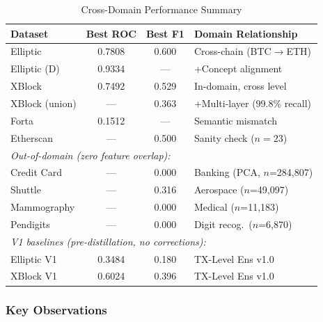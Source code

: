 \documentclass[journal]{IEEEtran}
\begin{document}
\begin{table}[!t]
\centering
\caption{Cross-Domain Performance Summary}
\label{tab:crossdomain}
\scriptsize
\begin{tabular}{lccl}
\toprule
\textbf{Dataset} & \textbf{Best ROC} & \textbf{Best F1} & \textbf{Domain Relationship} \\
\midrule
Elliptic & 0.7808 & 0.600 & Cross-chain (BTC$\to$ETH) \\
Elliptic (D) & 0.9334 & --- & +Concept alignment \\
XBlock & 0.7492 & 0.529 & In-domain, cross level \\
XBlock (union) & --- & 0.363 & +Multi-layer (99.8\% recall) \\
Forta & 0.1512 & --- & Semantic mismatch \\
Etherscan & --- & 0.500 & Sanity check ($n = 23$) \\
\midrule
\multicolumn{4}{l}{\textit{Out-of-domain (zero feature overlap):}} \\
Credit Card & --- & 0.000 & Banking (PCA, $n$=284,807) \\
Shuttle & --- & 0.316 & Aerospace ($n$=49,097) \\
Mammography & --- & 0.000 & Medical ($n$=11,183) \\
Pendigits & --- & 0.000 & Digit recog.\ ($n$=6,870) \\
\midrule
\multicolumn{4}{l}{\textit{V1 baselines (pre-distillation, no corrections):}} \\
Elliptic V1 & 0.3484 & 0.180 & TX-Level Ens v1.0 \\
XBlock V1 & 0.6024 & 0.396 & TX-Level Ens v1.0 \\
\bottomrule
\end{tabular}
\end{table}

\subsubsection{Key Observations}
\end{document}
